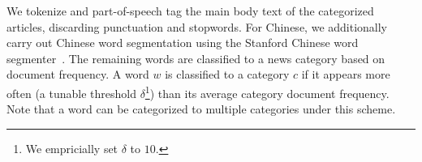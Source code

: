 \begin{CJK}{UTF8}{gbsn}


We tokenize and part-of-speech tag the main body text of the
categorized articles, discarding punctuation and stopwords.  For
Chinese, we additionally carry out Chinese word segmentation using
the Stanford Chinese word segmenter~\cite{Chang2008}. The remaining
words are classified to a news category based on document frequency. A
word $w$ is classified to a category $c$ if it appears  more often 
(a tunable threshold $\delta$\footnote{We empricially set $\delta$ to $10$.}) than its average category document
frequency.  Note that a word can be categorized to multiple categories
under this scheme.








\end{CJK}

